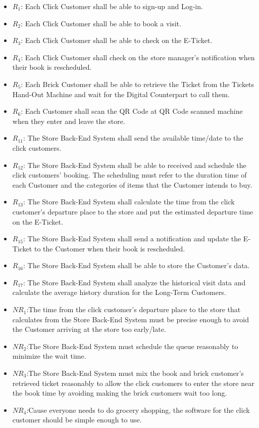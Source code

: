 \documentclass[a4paper,12pt]{report}
\begin{document}
\begin{itemize}
	\item $R_1$: Each Click Customer shall be able to sign-up and Log-in.
	\item $R_2$: Each Click Customer shall be able to book a visit.
	\item $R_3$: Each Click Customer shall be able to check on the E-Ticket.
	\item $R_4$: Each Click Customer shall check on the store manager's notification when their book is rescheduled.
	\item $R_5$: Each Brick Customer shall be able to retrieve the Ticket from the Tickets Hand-Out Machine and wait for the Digital Counterpart to call them.
	\item $R_6$: Each Customer shall scan the QR Code at QR Code scanned machine when they enter and leave the store.
	\item $R_{11}$: The Store Back-End System shall send the available time/date to the click customers.
	\item $R_{12}$: The Store Back-End System shall be able to received and schedule the click customers' booking. The scheduling must refer to the duration time of each Customer and the categories of items that the Customer intends to buy.
	\item $R_{13}$: The Store Back-End System shall calculate the time from the click customer's departure place to the store and put the estimated departure time on the E-Ticket.
	\item $R_{15}$: The Store Back-End System shall send a notification and update the E-Ticket to the Customer when their book is rescheduled.
	\item $R_{16}$: The Store Back-End System shall be able to store the Customer's data.
	\item $R_{17}$: The Store Back-End System shall analyze the historical visit data and calculate the average history duration for the Long-Term Customers.
	\item $NR_1$:The time from the click customer's departure place to the store that calculates from the Store Back-End System must be precise enough to avoid the Customer arriving at the store too early/late.
	\item $NR_2$:The Store Back-End System must schedule the queue reasonably to minimize the wait time.
	\item $NR_3$:The Store Back-End System must mix the book and brick customer's retrieved ticket reasonably to allow the click customers to enter the store near the book time by avoiding making the brick customers wait too long.
	\item $NR_4$:Cause everyone needs to do grocery shopping, the software for the click customer should be simple enough to use.
\end{itemize}
\end{document}

